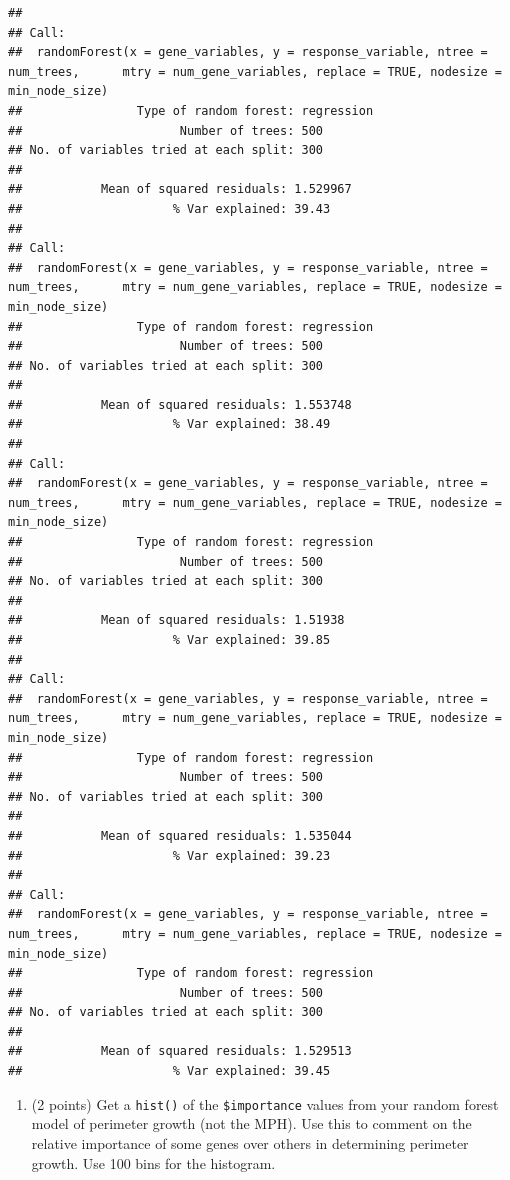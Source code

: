 \documentclass[
]{article}
\providecommand{\tightlist}{%
  \setlength{\itemsep}{0pt}\setlength{\parskip}{0pt}}
\begin{document}
\begin{verbatim}
## 
## Call:
##  randomForest(x = gene_variables, y = response_variable, ntree = num_trees,      mtry = num_gene_variables, replace = TRUE, nodesize = min_node_size) 
##                Type of random forest: regression
##                      Number of trees: 500
## No. of variables tried at each split: 300
## 
##           Mean of squared residuals: 1.529967
##                     % Var explained: 39.43
## 
## Call:
##  randomForest(x = gene_variables, y = response_variable, ntree = num_trees,      mtry = num_gene_variables, replace = TRUE, nodesize = min_node_size) 
##                Type of random forest: regression
##                      Number of trees: 500
## No. of variables tried at each split: 300
## 
##           Mean of squared residuals: 1.553748
##                     % Var explained: 38.49
## 
## Call:
##  randomForest(x = gene_variables, y = response_variable, ntree = num_trees,      mtry = num_gene_variables, replace = TRUE, nodesize = min_node_size) 
##                Type of random forest: regression
##                      Number of trees: 500
## No. of variables tried at each split: 300
## 
##           Mean of squared residuals: 1.51938
##                     % Var explained: 39.85
## 
## Call:
##  randomForest(x = gene_variables, y = response_variable, ntree = num_trees,      mtry = num_gene_variables, replace = TRUE, nodesize = min_node_size) 
##                Type of random forest: regression
##                      Number of trees: 500
## No. of variables tried at each split: 300
## 
##           Mean of squared residuals: 1.535044
##                     % Var explained: 39.23
## 
## Call:
##  randomForest(x = gene_variables, y = response_variable, ntree = num_trees,      mtry = num_gene_variables, replace = TRUE, nodesize = min_node_size) 
##                Type of random forest: regression
##                      Number of trees: 500
## No. of variables tried at each split: 300
## 
##           Mean of squared residuals: 1.529513
##                     % Var explained: 39.45
\end{verbatim}

\vspace{2cm}

\newpage

\begin{enumerate}
\def\labelenumi{\arabic{enumi}.}
\setcounter{enumi}{1}
\tightlist
\item
  (2 points) Get a \texttt{hist()} of the \texttt{\$importance} values
  from your random forest model of perimeter growth (not the MPH). Use
  this to comment on the relative importance of some genes over others
  in determining perimeter growth. Use 100 bins for the histogram.
\end{enumerate}
\end{document}
